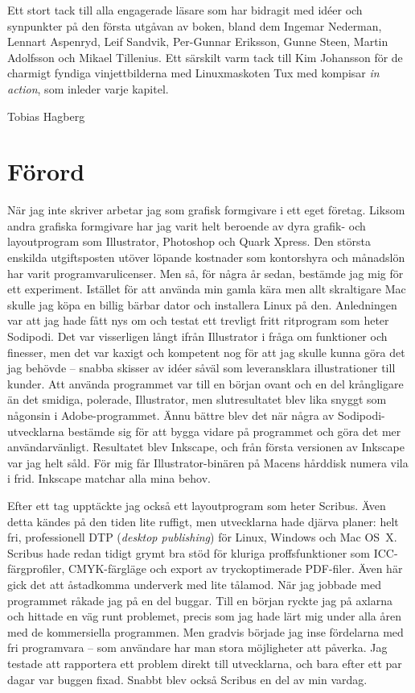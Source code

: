 \documentclass[a4paper,final]{memoir} %
\begin{document}
Ett stort tack till alla engagerade läsare som har bidragit med idéer och synpunkter på den första utgåvan av boken, bland dem Ingemar Nederman, Lennart Aspenryd, Leif Sandvik, Per-Gunnar Eriksson, Gunne Steen, Martin Adolfsson och Mikael Tillenius. Ett särskilt varm tack till Kim Johansson för de charmigt fyndiga vinjettbilderna med Linuxmaskoten Tux med kompisar \textit{in action}, som inleder varje kapitel.

\vspace*{2\baselineskip}

\noindent Tobias Hagberg


\chapter{Förord}\label{cha:forord}

När jag inte skriver arbetar jag som grafisk formgivare i ett eget företag. Liksom andra grafiska formgivare har jag varit helt beroende av dyra grafik- och layoutprogram som Illustrator, Photoshop och Quark Xpress. Den största enskilda utgiftsposten utöver löpande kostnader som kontorshyra och månadslön har varit programvarulicenser. Men så, för några år sedan, bestämde jag mig för ett experiment. Istället för att använda min gamla kära men allt skraltigare Mac skulle jag köpa en billig bärbar dator och installera Linux på den. Anledningen var att jag hade fått nys om och testat ett trevligt fritt ritprogram som heter Sodipodi. Det var visserligen långt ifrån Illustrator i fråga om funktioner och finesser, men det var kaxigt och kompetent nog för att jag skulle kunna göra det jag behövde -- snabba skisser av idéer såväl som leveransklara illustrationer till kunder. Att använda programmet var till en början ovant och en del krångligare än det smidiga, polerade, Illustrator, men slutresultatet blev lika snyggt som någonsin i Adobe-programmet. Ännu bättre blev det när några av Sodipodi-utvecklarna bestämde sig för att bygga vidare på programmet och göra det mer användarvänligt. Resultatet blev Inkscape, och från första versionen av Inkscape var jag helt såld. För mig får Illustrator-binären på Macens hårddisk numera vila i frid. Inkscape matchar alla mina behov.

Efter ett tag upptäckte jag också ett layoutprogram som heter Scribus. Även detta kändes på den tiden lite ruffigt, men utvecklarna hade djärva planer: helt fri, professionell DTP (\textit{desktop publishing}) för Linux, Windows och Mac OS~X. Scribus hade redan tidigt grymt bra stöd för kluriga proffsfunktioner som ICC-färgprofiler, CMYK-färgläge och export av tryck\-opti\-me\-ra\-de PDF-filer. Även här gick det att åstadkomma underverk med lite tålamod. När jag jobbade med programmet råkade jag   på en del buggar. Till en början ryckte jag på axlarna och hittade en väg runt problemet, precis som jag hade lärt mig under alla åren med de kommersiella programmen. Men gradvis började jag inse fördelarna med fri programvara -- som användare har man stora möjligheter att påverka. Jag testade att rapportera ett problem direkt till utvecklarna, och bara efter ett par dagar var buggen fixad. Snabbt blev också Scribus en del av min vardag.
\end{document}
